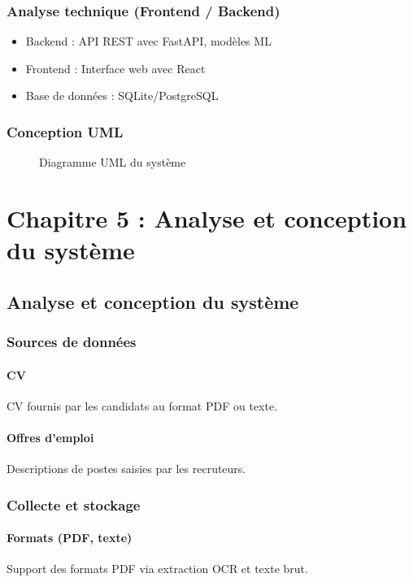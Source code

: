 \documentclass[12pt,a4paper]{report}
\begin{document}
\section{Analyse technique (Frontend / Backend)}
\begin{itemize}
\item Backend : API REST avec FastAPI, modèles ML
\item Frontend : Interface web avec React
\item Base de données : SQLite/PostgreSQL
\end{itemize}

\section{Conception UML}
\begin{figure}[h]
\centering
\caption{Diagramme UML du système}
\end{figure}

\part{Chapitre 5 : Analyse et conception du système}
\chapter{Analyse et conception du système}

\section{Sources de données}

\subsection{CV}
CV fournis par les candidats au format PDF ou texte.

\subsection{Offres d'emploi}
Descriptions de postes saisies par les recruteurs.

\section{Collecte et stockage}

\subsection{Formats (PDF, texte)}
Support des formats PDF via extraction OCR et texte brut.
\end{document}
